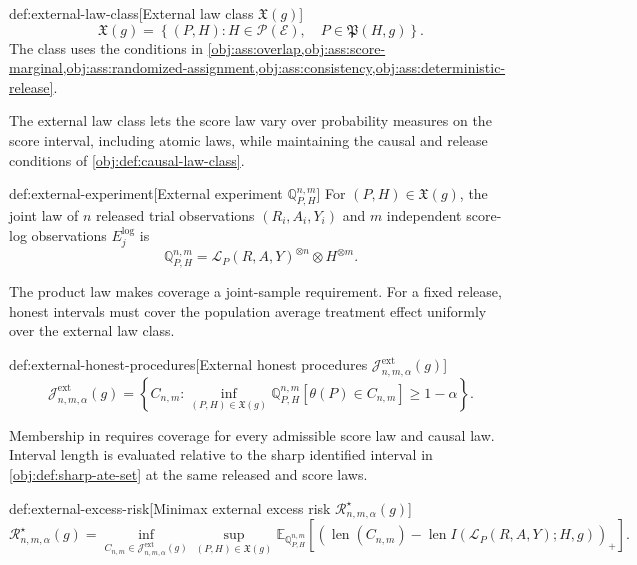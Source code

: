 \documentclass[11pt]{article}
\begin{document}
\begin{definitionv}{def:external-law-class}[External law class $\mathfrak X(g)$]
\[
\mathfrak X(g)
=
\left\{
(P,H):
H\in\mathcal P(\mathcal E),\quad
P\in\mathfrak P(H,g)
\right\}.
\]
The class uses the conditions in \cref{obj:ass:overlap,obj:ass:score-marginal,obj:ass:randomized-assignment,obj:ass:consistency,obj:ass:deterministic-release}.
\end{definitionv}

The external law class  lets the score law vary over probability measures on the score interval, including atomic laws, while maintaining the causal and release conditions of \cref{obj:def:causal-law-class}.

\begin{definitionv}{def:external-experiment}[External experiment $\mathbb Q_{P,H}^{n,m}$]
For \((P,H)\in\mathfrak X(g)\), the joint law of \(n\) released trial observations \((R_i,A_i,Y_i)\) and \(m\) independent score-log observations \(E_j^{\mathrm{log}}\) is
\[
\mathbb Q_{P,H}^{n,m}
=
\mathcal L_P(R,A,Y)^{\otimes n}\otimes H^{\otimes m}.
\]
\end{definitionv}

The product law  makes coverage a joint-sample requirement. For a fixed release, honest intervals must cover the population average treatment effect uniformly over the external law class.

\begin{definitionv}{def:external-honest-procedures}[External honest procedures $\mathcal J^{\mathrm{ext}}_{n,m,\alpha}(g)$]
\[
\mathcal J^{\mathrm{ext}}_{n,m,\alpha}(g)
=
\left\{
C_{n,m}:
\inf_{(P,H)\in\mathfrak X(g)}
\mathbb Q_{P,H}^{n,m}\!\left[
\theta(P)\in C_{n,m}
\right]
\ge 1-\alpha
\right\}.
\]
\end{definitionv}

Membership in  requires coverage for every admissible score law and causal law. Interval length is evaluated relative to the sharp identified interval in \cref{obj:def:sharp-ate-set} at the same released and score laws.

\begin{definitionv}{def:external-excess-risk}[Minimax external excess risk $\mathcal R^{\star}_{n,m,\alpha}(g)$]
\[
\mathcal R^{\star}_{n,m,\alpha}(g)
=
\inf_{C_{n,m}\in\mathcal J^{\mathrm{ext}}_{n,m,\alpha}(g)}
\sup_{(P,H)\in\mathfrak X(g)}
\mathbb E_{\mathbb Q_{P,H}^{n,m}}
\!\left[
\left(
\operatorname{len}(C_{n,m})
-
\operatorname{len}I(\mathcal L_P(R,A,Y);H,g)
\right)_+
\right].
\]
\end{definitionv}
\end{document}
